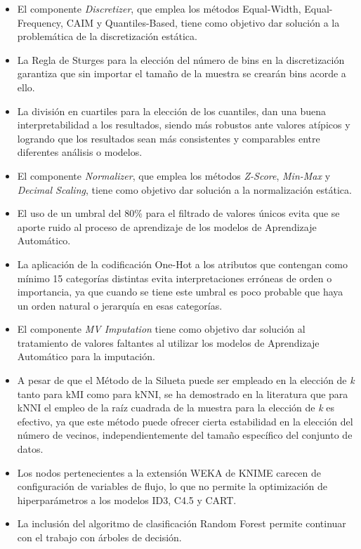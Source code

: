 \begin{itemize}
	\item El componente \textit{Discretizer}, que emplea los métodos Equal-Width, Equal-Frequency, CAIM y Quantiles-Based, tiene como objetivo dar solución a la problemática de la discretización estática. 
	\item La Regla de Sturges para la elección del número de bins en la discretización garantiza que sin importar el tamaño de la muestra se crearán bins acorde a ello.
	\item La división en cuartiles para la elección de los cuantiles, dan una buena interpretabilidad a los resultados, siendo más robustos ante valores atípicos y logrando que los resultados sean más consistentes y comparables entre diferentes análisis o modelos.
	\item El componente \textit{Normalizer}, que emplea los métodos \textit{Z-Score}, \textit{Min-Max} y \textit{Decimal Scaling}, tiene como objetivo dar solución a la normalización estática.
	\item El uso de un umbral del 80\% para el filtrado de valores únicos evita que se aporte ruido al proceso de aprendizaje de los modelos de Aprendizaje Automático. 
	\item La aplicación de la codificación One-Hot a los atributos que contengan como mínimo 15 categorías distintas evita interpretaciones erróneas de orden o importancia, ya que cuando se tiene este umbral es poco probable que haya un orden natural o jerarquía en esas categorías.
	\item El componente \textit{MV Imputation} tiene como objetivo dar solución al tratamiento de valores faltantes al utilizar los modelos de Aprendizaje Automático para la imputación.
	\item A pesar de que el Método de la Silueta puede ser empleado en la elección de \textit{k} tanto para kMI como para kNNI, se ha demostrado en la literatura que para kNNI el empleo de la raíz cuadrada de la muestra para la elección de \textit{k} es efectivo, ya que este método puede ofrecer cierta estabilidad en la elección del número de vecinos, independientemente del tamaño específico del conjunto de datos.
	\item Los nodos pertenecientes a la extensión WEKA de KNIME carecen de configuración de variables de flujo, lo que no permite la optimización de hiperparámetros a los modelos ID3, C4.5 y CART.
	\item La inclusión del algoritmo de clasificación Random Forest permite continuar con el trabajo con árboles de decisión.

\end{itemize}
